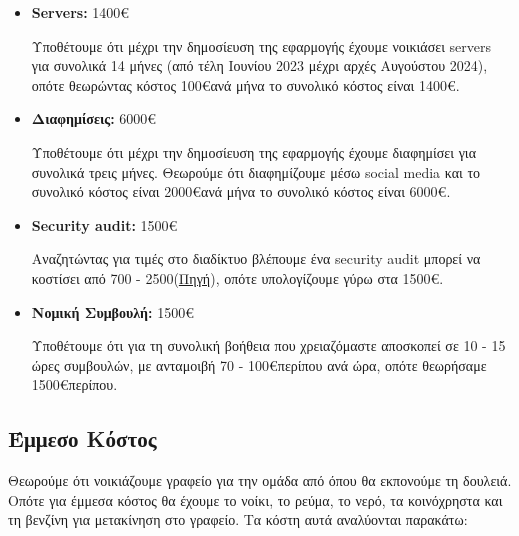\documentclass[12pt,a4paper]{article}
\begin{document}
\begin{itemize}
	\item \textbf{Servers:} 1400\euro

		Υποθέτουμε ότι μέχρι την δημοσίευση της εφαρμογής έχουμε νοικιάσει servers για συνολικά 14 μήνες (από τέλη Ιουνίου 2023 μέχρι αρχές Αυγούστου 2024), οπότε θεωρώντας κόστος 100\euro\space ανά μήνα το συνολικό κόστος είναι 1400\euro.

	\item \textbf{Διαφημίσεις:} 6000\euro

		Υποθέτουμε ότι μέχρι την δημοσίευση της εφαρμογής έχουμε διαφημίσει για συνολικά τρεις μήνες. Θεωρούμε ότι διαφημίζουμε μέσω social media και το συνολικό κόστος είναι 2000\euro\space ανά μήνα το συνολικό κόστος είναι 6000\euro.

	\item \textbf{Security audit:} 1500\euro

		Αναζητώντας για τιμές στο διαδίκτυο βλέπουμε ένα security audit μπορεί να κοστίσει από 700 - 2500\textdollar\space (\href{https://www.getastra.com/blog/security-audit/it-security-audit-cost/}{Πηγή}), οπότε υπολογίζουμε γύρω στα 1500\euro.

	\item \textbf{Νομική Συμβουλή:} 1500\euro

		Υποθέτουμε ότι για τη συνολική βοήθεια που χρειαζόμαστε αποσκοπεί σε 10 - 15 ώρες συμβουλών, με ανταμοιβή 70 - 100\euro\space περίπου ανά ώρα, οπότε θεωρήσαμε 1500\euro\space περίπου.
\end{itemize}

\subsection{Έμμεσο Κόστος}

Θεωρούμε ότι νοικιάζουμε γραφείο για την ομάδα από όπου θα εκπονούμε τη δουλειά. Οπότε για έμμεσα κόστος θα έχουμε το νοίκι, το ρεύμα, το νερό, τα κοινόχρηστα και τη βενζίνη για μετακίνηση στο γραφείο. Τα κόστη αυτά αναλύονται παρακάτω:
\end{document}
